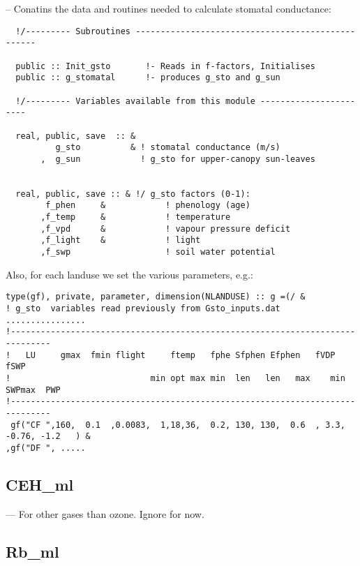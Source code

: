 \documentclass[12pt]{article}
\begin{document}
-- Conatins the data and routines needed to calculate stomatal conductance:
\begin{footnotesize}
\begin{verbatim}
  !/--------- Subroutines --------------------------------------------------

  public :: Init_gsto       !- Reads in f-factors, Initialises
  public :: g_stomatal      !- produces g_sto and g_sun

  !/--------- Variables available from this module -----------------------

  real, public, save  :: &
          g_sto          & ! stomatal conductance (m/s)
       ,  g_sun            ! g_sto for upper-canopy sun-leaves


  real, public, save :: & !/ g_sto factors (0-1):
        f_phen     &            ! phenology (age)
       ,f_temp     &            ! temperature
       ,f_vpd      &            ! vapour pressure deficit
       ,f_light    &            ! light
       ,f_swp                   ! soil water potential
\end{verbatim}
\end{footnotesize}


Also, for each landuse we set the various parameters, e.g.:
\begin{footnotesize}
\begin{verbatim}
type(gf), private, parameter, dimension(NLANDUSE) :: g =(/ &
! g_sto  variables read previously from Gsto_inputs.dat   ................
!------------------------------------------------------------------------------
!   LU     gmax  fmin flight     ftemp   fphe Sfphen Efphen   fVDP          fSWP
!                            min opt max min  len   len   max    min    SWPmax  PWP
!------------------------------------------------------------------------------
 gf("CF ",160,  0.1  ,0.0083,  1,18,36,  0.2, 130, 130,  0.6  , 3.3,  -0.76, -1.2   ) &
,gf("DF ", .....
\end{verbatim}
\end{footnotesize}


\subsection{CEH\_ml}

 --- For other gases than ozone. Ignore for now.

\subsection{Rb\_ml}
\end{document}
